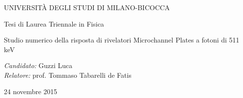 \begin{frame}[plain]



\begin{center}
	UNIVERSITÀ DEGLI STUDI DI MILANO-BICOCCA
\end{center}

\begin{center}
\end{center}

\begin{center}\footnotesize
Tesi di Laurea Triennale in Fisica
\end{center}

\begin{center}
\LARGE{
Studio numerico della risposta di rivelatori Microchannel Plates a fotoni di 511 keV}
\end{center}

\small{
\emph{Candidato:} 	Guzzi Luca\\
\emph{Relatore:}		prof. Tommaso Tabarelli de Fatis
}

\begin{center}
24 novembre 2015
\end{center}


\end{frame}